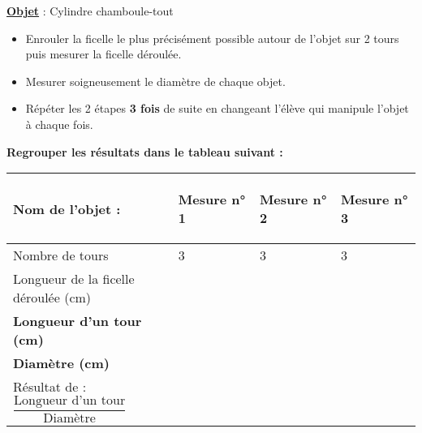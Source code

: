 \documentclass[a4paper,11pt]{article}
\newcommand{\bi}{\begin{itemize}}
\newcommand{\ei}{\end{itemize}}
\begin{document}
{\large \textbf{\underline{Objet}} : Cylindre chamboule-tout }\\

\bi

\item Enrouler la ficelle le plus précisément possible autour de l'objet sur 2 tours puis mesurer la ficelle déroulée.\\


\item Mesurer soigneusement le diamètre de chaque objet.\\

\item Répéter les 2 étapes \textbf{3 fois} de suite en changeant l'élève  qui manipule l'objet à chaque fois.\\


\ei

\textbf{Regrouper les résultats dans le tableau suivant : }

\renewcommand{\arraystretch}{2.2}

\begin{flushleft}
\begin{tabular}{|m{7cm}|m{3.5cm}|m{3.5cm}|m{3.5cm}|}
\hline 
\begin{center}
 \textbf{Nom de l'objet :}
 \end{center} & \begin{center}
\textbf{ Mesure n° 1}
 \end{center}  & \begin{center}
\textbf{ Mesure n° 2}
 \end{center} &  \begin{center}
\textbf{Mesure n° 3}
 \end{center}   \\ 
\hline 
Nombre de tours& 3 & 3 &  3   \\ 
\hline 
Longueur de la ficelle déroulée (cm) &  &   &    \\ 
\hline 
\textbf{Longueur d'un tour (cm)}&  &  &    \\ 
\hline 
\textbf{Diamètre (cm)} &  &  &     \\ 
\hline
Résultat de : \hspace*{0.75cm}$\dfrac{\text{Longueur d'un tour}}{\text{Diamètre}}$ &  &  &     \\ 
\hline
\end{tabular} 
\end{flushleft}
\vspace*{0.5cm}
\end{document}
